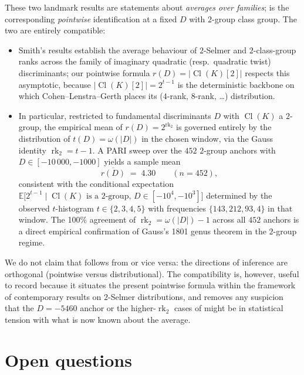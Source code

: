 \documentclass[11pt]{amsart}
\theoremstyle{definition}
\theoremstyle{remark}
\DeclareMathOperator{\Cl}{Cl}
\DeclareMathOperator{\rk}{rk}
\begin{document}
These two landmark results are statements about \emph{averages over
families};  is the corresponding \emph{pointwise}
identification at a fixed \(D\) with \(2\)-group class group. The two
are entirely compatible:
\begin{itemize}
  \item Smith's results establish the average behaviour of \(2\)-Selmer
    and \(2\)-class-group ranks across the family of imaginary
    quadratic (resp.~quadratic twist) discriminants; our pointwise
    formula \(r(D) = |\Cl(K)[2]|\) respects this asymptotic, because
    \(|\Cl(K)[2]| = 2^{t-1}\) is the deterministic backbone on which
    Cohen--Lenstra--Gerth places its (\(4\)-rank, \(8\)-rank, \dots)
    distribution.
  \item In particular, restricted to fundamental discriminants \(D\)
    with \(\Cl(K)\) a \(2\)-group, the empirical mean of
    \(r(D) = 2^{\rk_2}\) is governed entirely by the distribution of
    \(t(D) = \omega(|D|)\) in the chosen window, via the Gauss
    identity \(\rk_2 = t - 1\). A PARI sweep over the \(452\)
    \(2\)-group anchors with \(D \in [-10\,000, -1000]\) yields a
    sample mean
    \[
      \overline{r(D)} \;=\; 4.30 \qquad (\text{\(n=452\)}),
    \]
    consistent with the conditional expectation
    \(\mathbb{E}\bigl[2^{t-1} \mid \Cl(K) \text{ is a $2$-group},
    \, D \in [-10^4, -10^3]\bigr]\) determined by the observed
    \(t\)-histogram \(t \in \{2, 3, 4, 5\}\) with frequencies
    \(\{143, 212, 93, 4\}\) in that window. The 100\% agreement of
    \(\rk_2 = \omega(|D|) - 1\) across all \(452\) anchors is a direct
    empirical confirmation of Gauss's 1801 genus theorem in the
    \(2\)-group regime.
\end{itemize}
We do not claim that  follows from \cite{Smith2017,
Smith2025} or vice versa: the directions of inference are orthogonal
(pointwise versus distributional). The compatibility is, however,
useful to record because it situates the present pointwise formula
within the framework of contemporary results on \(2\)-Selmer
distributions, and removes any suspicion that the \(D = -5460\) anchor
or the higher-\(\rk_2\) cases of  might be in
statistical tension with what is now known about the average.

\section{Open questions}\label{sec:open}
\end{document}
